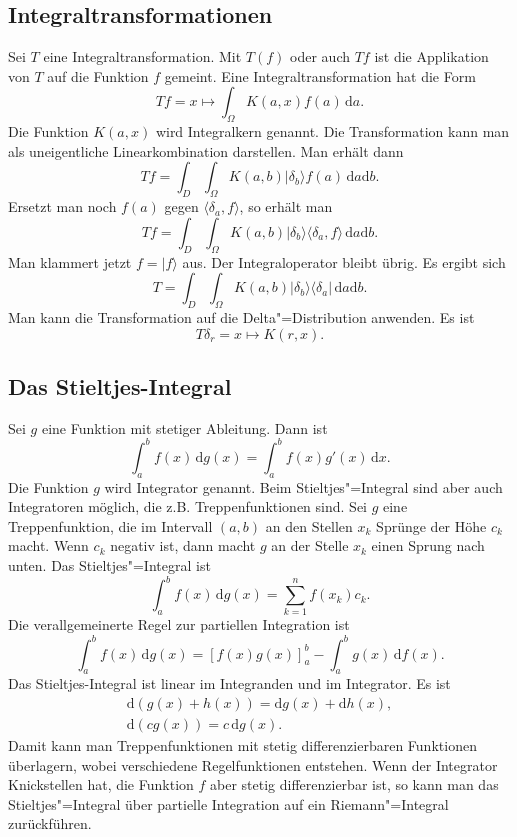 \documentclass[a4paper,10pt,fleqn,twocolumn,twoside]{article}
\begin{document}
\subsection{Integraltransformationen}

Sei \(T\) eine Integraltransformation. Mit \(T(f)\) oder auch
\(Tf\) ist die Applikation von \(T\) auf die Funktion \(f\) gemeint.
Eine Integraltransformation hat die Form
\[Tf = x\mapsto \int_{\Omega} K(a,x)f(a)\,\mathrm da.\]
%
Die Funktion \(K(a,x)\) wird Integralkern genannt. Die Transformation
kann man als uneigentliche Linearkombination darstellen.
Man erhält dann
\[Tf = \int_{D}\int_{\Omega} K(a,b)
|\delta_b\rangle f(a)\,\mathrm da\mathrm db.\]
%
Ersetzt man noch \(f(a)\) gegen \(\langle\delta_a,f\rangle\),
so erhält man
\[Tf = \int_{D}\int_{\Omega} K(a,b)
|\delta_b\rangle\langle\delta_a,f\rangle\,\mathrm da\mathrm db.\]
%
Man klammert jetzt \(f=|f\rangle\) aus. Der Integraloperator bleibt
übrig. Es ergibt sich
\[T = \int_{D}\int_{\Omega} K(a,b)
|\delta_b\rangle\langle\delta_a|\,\mathrm da\mathrm db.\]
%
Man kann die Transformation auf die Delta"=Distribution anwenden.
Es ist
\[T\delta_r = x\mapsto K(r,x).\]

\subsection{Das Stieltjes-Integral}

Sei \(g\) eine Funktion mit stetiger Ableitung. Dann ist
\[\int_a^b f(x)\,\mathrm dg(x) = \int_a^b f(x)g'(x)\,\mathrm dx.\]
Die Funktion \(g\) wird Integrator genannt. Beim Stieltjes"=Integral
sind aber auch Integratoren möglich, die z.B. Treppenfunktionen sind.
Sei \(g\) eine Treppenfunktion, die im Intervall \((a,b)\) an den
Stellen \(x_k\) Sprünge der Höhe \(c_k\) macht. Wenn \(c_k\) negativ
ist, dann macht \(g\) an der Stelle \(x_k\) einen Sprung nach unten.
Das Stieltjes"=Integral ist
\[\int_a^b f(x)\,\mathrm dg(x) = \sum_{k=1}^n f(x_k)c_k.\]
Die verallgemeinerte Regel zur partiellen Integration ist
\[\int_a^b f(x)\,\mathrm dg(x) = [f(x)g(x)]_a^b - \int_a^b g(x)\,\mathrm df(x).\]
Das Stieltjes-Integral ist linear im Integranden und im Integrator. Es ist
\begin{gather*}
\mathrm d(g(x)+h(x)) = \mathrm dg(x)+\mathrm dh(x),\\
\mathrm d(cg(x)) = c\,\mathrm dg(x).
\end{gather*}
Damit kann man Treppenfunktionen mit stetig differenzierbaren
Funktionen überlagern, wobei verschiedene Regelfunktionen entstehen.
Wenn der Integrator Knickstellen hat, die Funktion \(f\) aber stetig
differenzierbar ist, so kann man das Stieltjes"=Integral über
partielle Integration auf ein Riemann"=Integral zurückführen.
\end{document}
